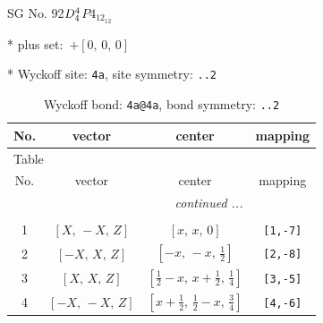 \documentclass[fleqn,8pt]{jsarticle}
\begin{document}
\setcounter{MaxMatrixCols}{32}

\renewcommand{\tablename}{Table~}
\renewcommand{\figurename}{Figure~}
\begin{center}
\LARGE
SG No. 92\quad$D_{\rm 4}^{4}$\quad$P4_12_12$\quad[ tetragonal ]
\end{center}

* plus set:\,\,\,$+\left[ 0,\, 0,\, 0 \right]$


* Wyckoff site: {\tt 4a}, site symmetry: {\tt ..2}
\renewcommand{\arraystretch}{1.2}
\begin{longtable}{cccc}
\caption{Wyckoff bond: {\tt 4a@4a}, bond symmetry: {\tt ..2}}
 \\
 \hline \hline
No. & vector & center & mapping \\ \hline \endfirsthead

\multicolumn{3}{l}{\tablename\ \thetable{}} \\
 \hline \hline
No. & vector & center & mapping \\ \hline \endhead

 \hline \hline
\multicolumn{3}{r}{\footnotesize\it continued ...} \\ \endfoot

 \hline \hline
\multicolumn{3}{r}{} \\ \endlastfoot

1 & $\left[ X,\, - X,\, Z \right]$ & $\left[ x,\, x,\, 0 \right]$ & {\tt [1,-7]} \\ \hline
2 & $\left[ - X,\, X,\, Z \right]$ & $\left[ - x,\, - x,\, \frac{1}{2} \right]$ & {\tt [2,-8]} \\ \hline
3 & $\left[ X,\, X,\, Z \right]$ & $\left[ \frac{1}{2} - x,\, x + \frac{1}{2},\, \frac{1}{4} \right]$ & {\tt [3,-5]} \\ \hline
4 & $\left[ - X,\, - X,\, Z \right]$ & $\left[ x + \frac{1}{2},\, \frac{1}{2} - x,\, \frac{3}{4} \right]$ & {\tt [4,-6]} \\
\end{longtable}
\renewcommand{\arraystretch}{1.2}
\end{document}
